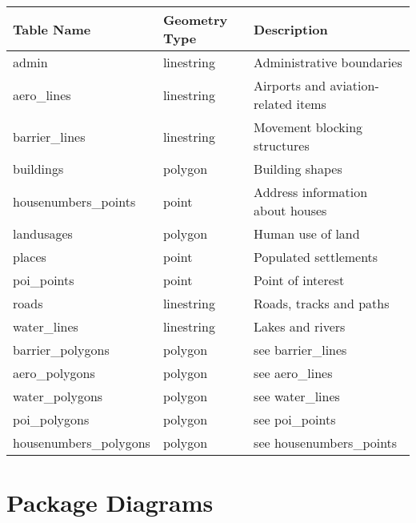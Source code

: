 \begin{center}
    \begin{tabular}{lll}
    \hline
    Table Name            & Geometry Type & Description \\
    \hline                                          
    admin                  & linestring    & Administrative boundaries \\
    aero\_lines            & linestring    & Airports and aviation-related items        \\
    barrier\_lines         & linestring    & Movement blocking structures   \\
    buildings              & polygon       & Building shapes                            \\
    housenumbers\_points   & point         & Address information about houses \\
    landusages             & polygon       & Human use of land \\
    places                 & point         & Populated settlements                      \\
    poi\_points            & point         & Point of interest                          \\
    roads                  & linestring    & Roads, tracks and paths          \\
    water\_lines           & linestring    & Lakes and rivers                           \\
    barrier\_polygons      & polygon       & see barrier\_lines                         \\
    aero\_polygons         & polygon       & see aero\_lines                            \\
    water\_polygons        & polygon       & see water\_lines                           \\
    poi\_polygons          & polygon       & see poi\_points                            \\
    housenumbers\_polygons & polygon       & see housenumbers\_points                   \\
    \end{tabular}
\end{center}

\section{Package Diagrams}


